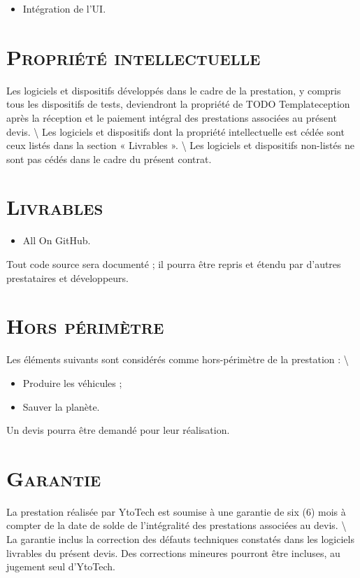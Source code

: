 \documentclass[10pt, a4paper]{article}
\begin{document}
    \begin{itemize}
      \item Intégration de l'UI.
    \end{itemize}\bigskip
    \section*{\textsc{Propriété intellectuelle}}
    Les logiciels et dispositifs développés dans le cadre de la
    prestation, y compris tous les dispositifs de tests, deviendront la
    propriété de TODO Templateception après la réception et le paiement
    intégral des prestations associées au présent devis.
    \textbackslash{} Les logiciels et dispositifs dont la propriété
    intellectuelle est cédée sont ceux listés dans la section «
    Livrables ». \textbackslash{} Les logiciels et dispositifs
    non-listés ne sont pas cédés dans le cadre du présent contrat.
    \section*{\textsc{Livrables}}
    \begin{itemize}
      \item All On GitHub.
    \end{itemize}\bigskip

    \noindent Tout code source sera documenté ; il pourra être repris et
    étendu par d'autres prestataires et développeurs.
    \section*{\textsc{Hors périmètre}}
    Les éléments suivants sont considérés comme hors-périmètre de la
    prestation : \textbackslash{}

    \begin{itemize}
      \item Produire les véhicules ;
      \item Sauver la planète.
    \end{itemize}\bigskip

    Un devis pourra être demandé pour leur réalisation.
    \section*{\textsc{Garantie}}
    La prestation réalisée par YtoTech est soumise à une garantie de six
    (6) mois à compter de la date de solde de l'intégralité des
    prestations associées au devis. \textbackslash{} La garantie inclus
    la correction des défauts techniques constatés dans les logiciels
    livrables du présent devis. Des corrections mineures pourront être
    incluses, au jugement seul d'YtoTech.
\end{document}
